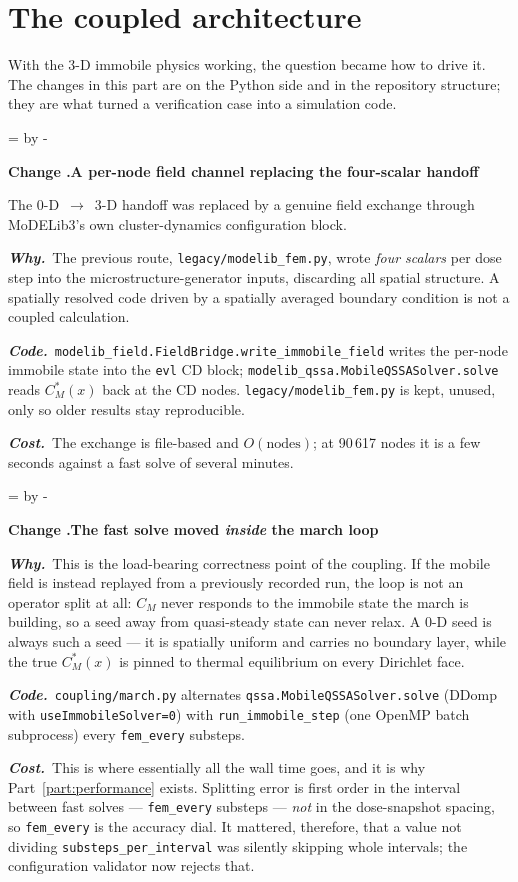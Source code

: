 \documentclass[11pt,a4paper]{article}
\newcommand{\code}[1]{\texttt{\small #1}}
\newcommand{\needlines}[1]{%
  \par\dimen0=\pagegoal \advance\dimen0 by -\pagetotal
  \ifdim\dimen0<#1\baselineskip \newpage \fi}
\newcounter{chg}
\newcommand{\change}[1]{%
  \needlines{4}%
  \refstepcounter{chg}%
  \par\medskip\noindent
  {\bfseries\boldmath Change \thechg.\quad #1}%
  \par\nobreak\smallskip}
\newcommand{\why}[1]{\par\noindent\textbf{\itshape Why.}\ #1\par}
\newcommand{\impact}[1]{\par\noindent\textbf{\itshape Code.}\ #1\par}
\newcommand{\cost}[1]{\par\noindent\textbf{\itshape Cost.}\ #1\par}
\begin{document}
\part{The coupled architecture}
\label{part:coupling}

With the 3-D immobile physics working, the question became how to drive it.
The changes in this part are on the Python side and in the repository
structure; they are what turned a verification case into a simulation code.

\change{A per-node field channel replacing the four-scalar handoff}
\label{chg:fieldchannel}
The 0-D~$\rightarrow$~3-D handoff was replaced by a genuine field exchange
through MoDELib3's own cluster-dynamics configuration block.
\why{The previous route, \code{legacy/modelib\_fem.py}, wrote \emph{four
scalars} per dose step into the microstructure-generator inputs, discarding all
spatial structure. A spatially resolved code driven by a spatially averaged
boundary condition is not a coupled calculation.}
\impact{\code{modelib\_field.FieldBridge.write\_immobile\_field} writes the
per-node immobile state into the \code{evl} CD block;
\code{modelib\_qssa.MobileQSSASolver.solve} reads $C_M^*(x)$ back at the CD
nodes. \code{legacy/modelib\_fem.py} is kept, unused, only so older results
stay reproducible.}
\cost{The exchange is file-based and $O(\text{nodes})$; at 90\,617 nodes it is
a few seconds against a fast solve of several minutes.}

\change{The fast solve moved \emph{inside} the march loop}
\label{chg:fastinside}
\why{This is the load-bearing correctness point of the coupling. If the mobile
field is instead replayed from a previously recorded run, the loop is not an
operator split at all: $C_M$ never responds to the immobile state the march is
building, so a seed away from quasi-steady state can never relax. A 0-D seed
is always such a seed --- it is spatially uniform and carries no boundary
layer, while the true $C_M^*(x)$ is pinned to thermal equilibrium on every
Dirichlet face.}
\impact{\code{coupling/march.py} alternates
\code{qssa.MobileQSSASolver.solve} (DDomp with \code{useImmobileSolver=0})
with \code{run\_immobile\_step} (one OpenMP batch subprocess) every
\code{fem\_every} substeps.}
\cost{This is where essentially all the wall time goes, and it is why
Part~\ref{part:performance} exists. Splitting error is first order in the
interval between fast solves --- \code{fem\_every} substeps --- \emph{not} in
the dose-snapshot spacing, so \code{fem\_every} is the accuracy dial. It
mattered, therefore, that a value not dividing \code{substeps\_per\_interval}
was silently skipping whole intervals; the configuration validator now rejects
that.}
\end{document}
